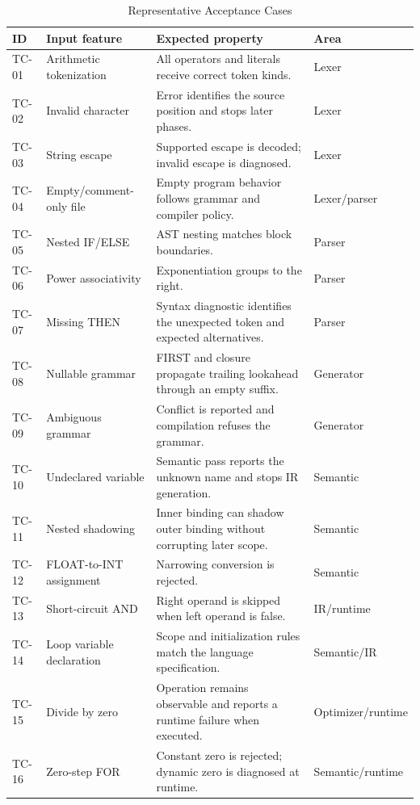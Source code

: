 \documentclass[12pt,a4paper,oneside]{report}
\begin{document}
\begin{longtable}{p{1.2cm}p{}p{}p{}}
\caption{Representative Acceptance Cases}\\
\toprule
\textbf{ID} & \textbf{Input feature} & \textbf{Expected property} & \textbf{Area}\\
\midrule
TC-01 & Arithmetic tokenization & All operators and literals receive correct token kinds. & Lexer\\
TC-02 & Invalid character & Error identifies the source position and stops later phases. & Lexer\\
TC-03 & String escape & Supported escape is decoded; invalid escape is diagnosed. & Lexer\\
TC-04 & Empty/comment-only file & Empty program behavior follows grammar and compiler policy. & Lexer/parser\\
TC-05 & Nested IF/ELSE & AST nesting matches block boundaries. & Parser\\
TC-06 & Power associativity & Exponentiation groups to the right. & Parser\\
TC-07 & Missing THEN & Syntax diagnostic identifies the unexpected token and expected alternatives. & Parser\\
TC-08 & Nullable grammar & FIRST and closure propagate trailing lookahead through an empty suffix. & Generator\\
TC-09 & Ambiguous grammar & Conflict is reported and compilation refuses the grammar. & Generator\\
TC-10 & Undeclared variable & Semantic pass reports the unknown name and stops IR generation. & Semantic\\
TC-11 & Nested shadowing & Inner binding can shadow outer binding without corrupting later scope. & Semantic\\
TC-12 & FLOAT-to-INT assignment & Narrowing conversion is rejected. & Semantic\\
TC-13 & Short-circuit AND & Right operand is skipped when left operand is false. & IR/runtime\\
TC-14 & Loop variable declaration & Scope and initialization rules match the language specification. & Semantic/IR\\
TC-15 & Divide by zero & Operation remains observable and reports a runtime failure when executed. & Optimizer/runtime\\
TC-16 & Zero-step FOR & Constant zero is rejected; dynamic zero is diagnosed at runtime. & Semantic/runtime\\

\end{longtable}
\end{document}
